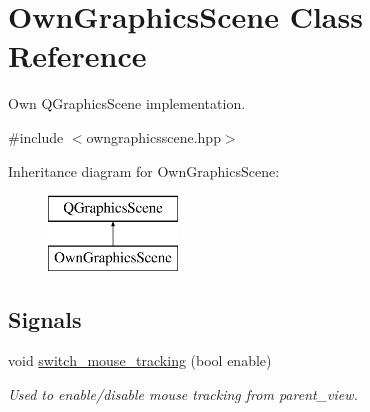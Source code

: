 \hypertarget{classOwnGraphicsScene}{}\section{Own\+Graphics\+Scene Class Reference}
\label{classOwnGraphicsScene}


Own Q\+Graphics\+Scene implementation.  




{\ttfamily \#include $<$owngraphicsscene.\+hpp$>$}

Inheritance diagram for Own\+Graphics\+Scene\+:\begin{figure}[H]
\begin{center}
\leavevmode
\includegraphics[height=2.000000cm]{classOwnGraphicsScene}
\end{center}
\end{figure}
\subsection*{Signals}
\begin{DoxyCompactItemize}
\item 
\mbox{\label{classOwnGraphicsScene_af9c3dcf53da255fccf5fb2633d659299}} 
void \mbox{\hyperlink{classOwnGraphicsScene_af9c3dcf53da255fccf5fb2633d659299}{switch\+\_\+mouse\+\_\+tracking}} (bool enable)
\begin{DoxyCompactList}\small\item\em Used to enable/disable mouse tracking from parent\+\_\+view. \end{DoxyCompactList}\end{DoxyCompactItemize}
